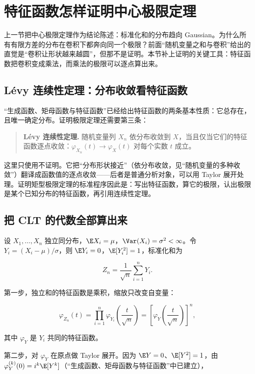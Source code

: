 \section{特征函数怎样证明中心极限定理}

上一节把中心极限定理作为结论陈述：标准化和的分布趋向 Gaussian。为什么所有有限方差的分布在卷积下都奔向同一个极限？前面``随机变量之和与卷积''给出的直觉是``卷积让形状越来越圆''，但那不是证明。本节补上证明的关键工具：特征函数把卷积变成乘法，而乘法的极限可以逐点算出来。

\subsection{Lévy 连续性定理：分布收敛看特征函数}

``生成函数、矩母函数与特征函数''已经给出特征函数的两条基本性质：它总存在，且唯一确定分布。证明极限定理还需要第三条：

\begin{quote}
\textbf{Lévy 连续性定理.} 随机变量列 \(X_n\) 依分布收敛到 \(X\)，当且仅当它们的特征函数逐点收敛：\(\varphi_{X_n}(t)\to\varphi_X(t)\) 对每个实数 \(t\) 成立。
\end{quote}

这里只使用不证明。它把``分布形状接近''（依分布收敛，见``随机变量的多种收敛''）翻译成函数值的逐点收敛——后者是普通分析对象，可以用 Taylor 展开处理。证明矩型极限定理的标准程序因此是：写出特征函数，算它的极限，认出极限是某个已知分布的特征函数，再引用连续性定理。

\subsection{把 CLT 的代数全部算出来}

设 \(X_1,\ldots,X_n\) 独立同分布，\(\E X_i=\mu\)，\(\Var(X_i)=\sigma^2<\infty\)。令 \(Y_i=(X_i-\mu)/\sigma\)，则 \(\E Y_i=0\)，\(\E[Y_i^2]=1\)，标准化和为

\[
Z_n=\frac1{\sqrt n}\sum_{i=1}^n Y_i.
\]

第一步，独立和的特征函数是乘积，缩放只改变自变量：

\[
\varphi_{Z_n}(t)
=\prod_{i=1}^n\varphi_{Y_i}\!\left(\frac{t}{\sqrt n}\right)
=\left[\varphi_Y\!\left(\frac{t}{\sqrt n}\right)\right]^n,
\]

其中 \(\varphi_Y\) 是 \(Y_i\) 共同的特征函数。

第二步，对 \(\varphi_Y\) 在原点做 Taylor 展开。因为 \(\E Y=0\)、\(\E[Y^2]=1\)，由 \(\varphi_Y^{(k)}(0)=i^k\E[Y^k]\)（``生成函数、矩母函数与特征函数''中已建立），


